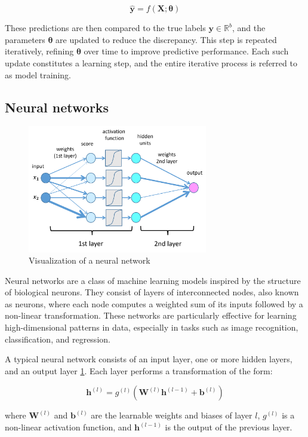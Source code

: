 \documentclass{pracalicmgr}
\begin{document}
\[
\hat{\mathbf{y}} = f(\mathbf{X}; \boldsymbol{\theta})
\]

These predictions are then compared to the true labels \( \mathbf{y} \in \mathbb{R}^b \), and the parameters \( \boldsymbol{\theta} \) are updated to reduce the discrepancy. This step is repeated iteratively, refining \( \boldsymbol{\theta} \) over time to improve predictive performance. Each such update constitutes a learning step, and the entire iterative process is referred to as model training.

\subsection{Neural networks}

\begin{figure}[H]
\centering
\includegraphics[width=0.7\textwidth]{src/deepNet.png}
\caption{Visualization of a neural network}
\label{fig:deepN}
\end{figure}

Neural networks are a class of machine learning models inspired by the structure of biological neurons. They consist of layers of interconnected nodes, also known as neurons, where each node computes a weighted sum of its inputs followed by a non-linear transformation. These networks are particularly effective for learning high-dimensional patterns in data, especially in tasks such as image recognition, classification, and regression.

A typical neural network consists of an input layer, one or more hidden layers, and an output layer \ref{fig:deepN}. Each layer performs a transformation of the form:

\[
\mathbf{h}^{(l)} = g^{(l)}(\mathbf{W}^{(l)} \mathbf{h}^{(l-1)} + \mathbf{b}^{(l)})
\]

where \( \mathbf{W}^{(l)} \) and \( \mathbf{b}^{(l)} \) are the learnable weights and biases of layer \( l \), \( g^{(l)} \) is a non-linear activation function, and \( \mathbf{h}^{(l-1)} \) is the output of the previous layer.
\end{document}
